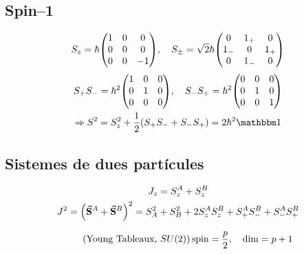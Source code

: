 \subsection{Spin--1}
\begin{align*}
	S_{z} = \hbar \mqty(\dmat[0]{1,0,-1}) \qc S_{\pm} = \sqrt{2}\hbar \mqty( 0 & 1_{+} & 0 \\ 1_{-} & 0 & 1_{+} \\ 0 & 1_{-} & 0 )
\end{align*}
\begin{align*}
\begin{gathered}
	S_{+}S_{-} = \hbar^{2} \mqty(\dmat[0]{1,1,0}) \qc S_{-}S_{+} = \hbar^{2} \mqty(\dmat[0]{0,1,1}) \\
	\Rightarrow S^{2} = S_{z}^{2} + \frac{1}{2} \qty(S_{+}S_{-} + S_{-}S_{+}) = 2\hbar^{2} \bbid
\end{gathered}
\end{align*}

\subsection{Sistemes de dues partícules}
\begin{align*}
\begin{gathered}
	J_{z} = S_{z}^{A} + S_{z}^{B} \\
	J^{2} = \qty(\va{S}^{A} + \va{S}^{B})^{2} = S_{A}^{2} + S_{B}^{2} + 2 S_{z}^{A} S_{z}^{B} + S_{+}^{A} S_{-}^{B} + S_{-}^{A} S_{+}^{B}
\end{gathered}
\end{align*}

\begin{align}\tag{Young Tableaux, $SU(2)$}
	\operatorname{spin} = \frac{p}{2} \qc \operatorname{dim} = p + 1
\end{align}
